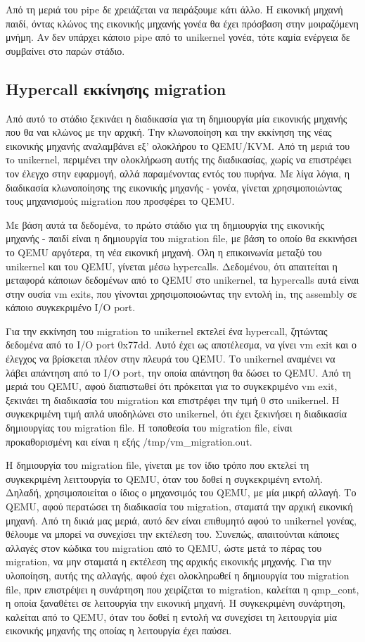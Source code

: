 Από τη μεριά του pipe δε χρειάζεται να πειράξουμε κάτι άλλο. Η εικονική μηχανή
παιδί, όντας κλώνος της εικονικής μηχανής γονέα θα έχει πρόσβαση στην
μοιραζόμενη μνήμη. Αν δεν υπάρχει κάποιο pipe από το unikernel γονέα, τότε καμία
ενέργεια δε συμβαίνει στο παρών στάδιο.

\subsection{Hypercall εκκίνησης migration}

Από αυτό το στάδιο ξεκινάει η διαδικασία για τη δημιουργία μία εικονικής μηχανής
που θα ναι κλώνος με την αρχική. Την κλωνοποίηση και την εκκίνηση της νέας
εικονικής μηχανής αναλαμβάνει εξ' ολοκλήρου το QEMU/KVM. Από τη μεριά του τo 
unikernel, περιμένει την ολοκλήρωση αυτής της διαδικασίας, χωρίς να επιστρέφει
τον έλεγχο στην εφαρμογή, αλλά παραμένοντας εντός του πυρήνα. Με λίγα λόγια, η
διαδικασία κλωνοποίησης της εικονικής μηχανής - γονέα, γίνεται χρησιμοποιώντας
τους μηχανισμούς migration που προσφέρει το QEMU. 

Με βάση αυτά τα δεδομένα, το πρώτο στάδιο για τη δημιουργία της εικονικής
μηχανής - παιδί είναι η δημιουργία του migration file, με βάση το οποίο θα
εκκινήσει το QEMU αργότερα, τη νέα εικονική μηχανή. Όλη η επικοινωνία μεταξύ του
unikernel και του QEMU, γίνεται μέσω hypercalls. Δεδομένου, ότι απαιτείται η
μεταφορά κάποιων δεδομένων από το QEMU στο unikernel, τα hypercalls αυτά είναι
στην ουσία vm exits, που γίνονται χρησιμοποιοώντας την εντολή in, της assembly
σε κάποιο συγκεκριμένο I/O port. 

Για την εκκίνηση του migration το unikernel εκτελεί ένα hypercall, ζητώντας
δεδομένα από το I/O port 0x77dd. Αυτό έχει ως αποτέλεσμα, να γίνει vm exit και ο
έλεγχος να βρίσκεται πλέον στην πλευρά του QEMU. Το unikernel αναμένει να λάβει
απάντηση από το I/O port, την οποία απάντηση θα δώσει το QEMU. Από τη μεριά του
QEMU, αφού διαπιστωθεί ότι πρόκειται για το συγκεκριμένο vm exit, ξεκινάει τη
διαδικασία του migration και επιστρέφει την τιμή 0 στο unikernel. H συγκεκριμένη
τιμή απλά υποδηλώνει στο unikernel, ότι έχει ξεκινήσει η διαδικασία δημιουργίας
του migration file. Η τοποθεσία του migration file, είναι προκαθορισμένη και
είναι η εξής /tmp/vm\_migration.out. 

Η δημιουργία του migration file, γίνεται με τον ίδιο τρόπο που εκτελεί τη
συγκεκριμένη λειττουργία το QEMU, όταν του δοθεί η συγκεκριμένη εντολή. Δηλαδή,
χρησιμοποιείται ο ίδιος ο μηχανσιμός του QEMU, με μία μικρή αλλαγή. Το QEMU,
αφού περατώσει τη διαδικασία του migration, σταματά την αρχική εικονική μηχανή.
Από τη δικιά μας μεριά, αυτό δεν είναι επιθυμητό αφού το unikernel γονέας,
θέλουμε να μπορεί να συνεχίσει την εκτέλεση του. Συνεπώς, απαιτούνται κάποιες
αλλαγές στον κώδικα του migration από το QEMU, ώστε μετά το πέρας του migration,
να μην σταματά η εκτέλεση της αρχικής εικονικής μηχανής. Για την υλοποίηση,
αυτής της αλλαγής, αφού έχει ολοκληρωθεί η δημιουργία του migration file, πριν
επιστρέψει η συνάρτηση που χειρίζεται το migration, καλείται η qmp\_cont, η
οποία ξαναθέτει σε λειτουργία την εικονική μηχανή. Η συγκεκριμένη συνάρτηση, καλείται από το
QEMU, όταν του δοθεί η εντολή να συνεχίσει τη λειτουργία μία εικονικής μηχανής
της οποίας η λειτουργία έχει παύσει. 

